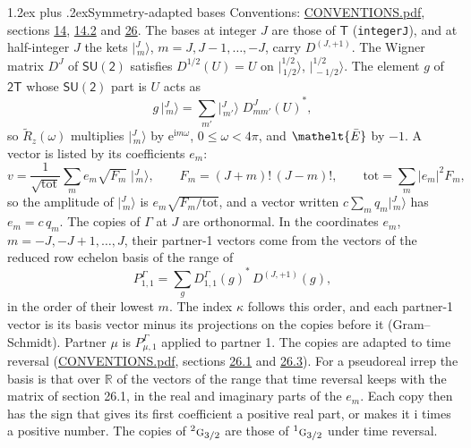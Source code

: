 \documentclass[10pt,a4paper]{article}
\makeatletter
\renewcommand\section{\@startsection{section}{1}{\z@}{-3ex plus -1ex minus -.2ex}%
  {1.2ex plus .2ex}{\normalfont\large\sffamily\bfseries\color{parttitle}}}
\numberwithin{equation}{section}
\newcommand{\eltfont}[1]{{\let\sigma\eltsigma\mathelt{#1}}}
\newcommand{\grp}[1]{\mathsf{#1}}
\newcommand{\irr}[1]{\text{\normalfont\scshape #1}}
\newcommand{\conjpair}[1]{{}^{#1}}
\newcommand{\elt}[1]{\eltfont{#1}}
\newcommand{\iunit}{\mathrm{i}}
\newcommand{\expe}{\mathrm{e}}
\newcommand{\irrJp}[2]{D^{(#1,#2)}}
\newcommand{\repD}[1]{D^{#1}}
\newcommand{\wignerD}[1]{D^{#1}}
\newcommand{\conj}[1]{{#1}^{*}}
\newcommand{\mult}{\kappa}
\newcommand{\intx}{\mu}
\newcommand{\jm}[2]{\bigl\lvert{}^{#1}_{\,#2}\bigr\rangle}
\newcommand{\barred}[1]{\bar{#1}}
\newcommand{\lift}[1]{\tilde{#1}}
\makeatother
\begin{document}
\section{Symmetry-adapted bases}\label{s:bases}
Conventions: \href{../../CONVENTIONS.pdf}{CONVENTIONS.pdf}, sections \href{../../../rotation/CONVENTIONS.pdf\#conv.14}{14}, \href{../../../rotation/CONVENTIONS.pdf\#conv.14.2}{14.2} and \href{../../CONVENTIONS.pdf\#conv.26}{26}.
\leavevmode\label{n:index.m}\label{n:vector.ket}The bases at integer $J$ are those of \href{../../../rotation/data/pdf/T.pdf}{$\grp{T}$} (\texttt{integerJ}), and at half-integer $J$ the kets $\jm{J}{m}$, $m = J, J-1, \dots, -J$, carry $\irrJp{J}{+1}$. \label{n:matrix.wigner}The Wigner matrix $\wignerD{J}$ of $\grp{SU(2)}$ satisfies $\wignerD{1/2}(U) = U$ on $\jm{1/2}{1/2}$, $\jm{1/2}{-1/2}$. The element $g$ of $\grp{2T}$ whose $\grp{SU(2)}$ part is $U$ acts as
\begin{equation}\label{e:action}g\,\jm{J}{m} = \sum_{m'} \jm{J}{m'}\; \conj{\wignerD{J}_{m m'}(U)},\end{equation}
so $\lift{R}_{z}(\omega)$ multiplies $\jm{J}{m}$ by $\expe^{\iunit m\omega}$, $0 \le \omega < 4\pi$, and $\elt{\barred{E}}$ by $-1$. \label{n:index.ketcoefficient}\label{n:vector.basis.symmetry}\label{n:index.ketweight}\label{n:index.total}A vector is listed by its coefficients $e_m$:
\begin{equation}\label{e:ket}v = \frac{1}{\sqrt{\mathrm{tot}}}\sum_m e_m\sqrt{F_m}\;\jm{J}{m},\qquad F_m = (J+m)!\,(J-m)!,\qquad \mathrm{tot} = \sum_m |e_m|^2F_m,\end{equation}
\leavevmode\label{n:index.factor.c}so the amplitude of $\jm{J}{m}$ is $e_m\sqrt{F_m/\mathrm{tot}}$, and a vector written $c\sum_m q_m\jm{J}{m}$ has $e_m = c\,q_m$.
The copies of $\Gamma$ at $J$ are orthonormal. \label{n:matrix.projector}In the coordinates $e_m$, $m = -J, -J+1, \dots, J$, their partner-1 vectors come from the vectors of the reduced row echelon basis of the range of
\begin{equation}\label{e:projector}P^\Gamma_{1,1} = \sum_g \conj{\repD{\Gamma}_{1,1}(g)}\,\irrJp{J}{+1}(g),\end{equation}
in the order of their lowest $m$. The index $\mult$ follows this order, and each partner-1 vector is its basis vector minus its projections on the copies before it (Gram--Schmidt). Partner $\intx$ is $P^\Gamma_{\intx,1}$ applied to partner 1. The copies are adapted to time reversal (\href{../../CONVENTIONS.pdf}{CONVENTIONS.pdf}, sections \href{../../CONVENTIONS.pdf\#conv.26.1}{26.1} and \href{../../CONVENTIONS.pdf\#conv.26.3}{26.3}). For a pseudoreal irrep the basis is that over $\mathbb{R}$ of the vectors of the range that time reversal keeps with the matrix of section 26.1, in the real and imaginary parts of the $e_m$. Each copy then has the sign that gives its first coefficient a positive real part, or makes it $\iunit$ times a positive number. The copies of $\conjpair{2}\irr{g}_{3/2}$ are those of $\conjpair{1}\irr{g}_{3/2}$ under time reversal.
\end{document}
